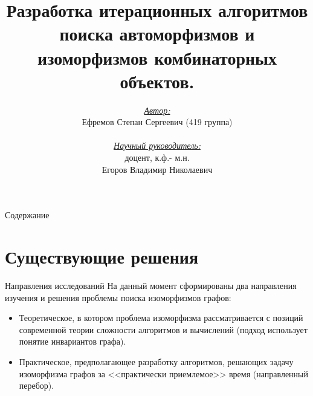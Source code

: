 \documentclass{beamer}
\begin{document}
\title{Разработка итерационных алгоритмов поиска автоморфизмов
и изоморфизмов комбинаторных объектов.}


\author{\textit{\underline{Автор:}}\\ Ефремов Степан Сергеевич (419 группа)\\ \\
\textit{\underline {Научный руководитель:}}\\ доцент, к.ф.- м.н.\\ Егоров Владимир Николаевич}

\date{}



\begin{frame}{}
\titlepage
\end{frame}


\begin{frame}{Содержание}
\tableofcontents
\end{frame} 



\section{Существующие решения}
\begin{frame}{Направления исследований}
На данный момент сформированы два направления изучения и решения проблемы поиска изоморфизмов графов:
\begin{itemize}
\item Теоретическое, в котором проблема изоморфизма рассматривается с позиций современной теории сложности алгоритмов и вычислений (подход использует понятие инвариантов графа).

\item Практическое, предполагающее разработку алгоритмов, решающих задачу изоморфизма графов за <<практически приемлемое>> время (направленный перебор).
\end{itemize}
\end{frame}
\end{document}

